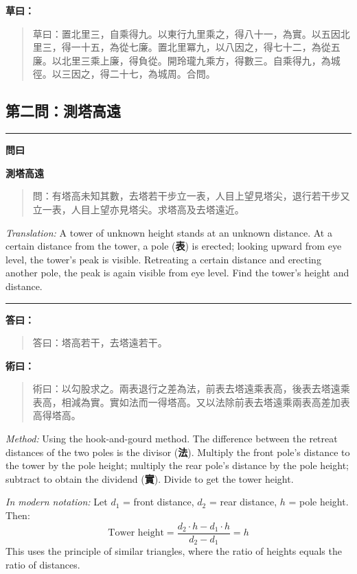 \documentclass[11pt,a4paper]{article}
\newenvironment{problem}[1][]{%
  \medskip\noindent\rule{\textwidth}{0.4pt}%
  \par\noindent\textbf{\color{sectioncolor}#1}\par\nopagebreak%
  \smallskip%
}{%
  \par\noindent\rule{\textwidth}{0.4pt}\medskip%
}
\newenvironment{answer}{%
  \medskip\noindent{\color{answercolor}\rule{0.5\textwidth}{0.5pt}}%
  \par\color{answercolor}%
}{%
  \par\medskip%
}
\newenvironment{method}{%
  \medskip\noindent{\color{methodcolor}\rule{0.5\textwidth}{0.5pt}}%
  \par\color{methodcolor}%
}{%
  \par\medskip%
}
\begin{document}
\noindent\textbf{草曰：}
\begin{quote}
\textcolor{chinacolor}{%
草曰：置北里三，自乘得九。以東行九里乘之，得八十一，為實。以五因北里三，得一十五，為從七廉。置北里冪九，以八因之，得七十二，為從五廉。以北里三乘上廉，得負從。開玲瓏九乘方，得數三。自乘得九，為城徑。以三因之，得二十七，為城周。合問。
}
\end{quote}

\subsection*{第二問：測塔高遠}

\begin{problem}[\textbf{問曰}]
\textbf{\color{sectioncolor}測塔高遠}

\begin{quote}
\textcolor{chinacolor}{%
問：有塔高未知其數，去塔若干步立一表，人目上望見塔尖，退行若干步又立一表，人目上望亦見塔尖。求塔高及去塔遠近。
}
\end{quote}

\textit{Translation:} A tower of unknown height stands at an unknown 
distance. At a certain distance from the tower, a pole (\textbf{表}) is erected; 
looking upward from eye level, the tower's peak is visible. Retreating 
a certain distance and erecting another pole, the peak is again visible 
from eye level. Find the tower's height and distance.
\end{problem}

\begin{answer}
\textbf{答曰：}

\begin{quote}
\textcolor{chinacolor}{%
答曰：塔高若干，去塔遠若干。
}
\end{quote}
\end{answer}

\begin{method}
\textbf{術曰：}

\begin{quote}
\textcolor{chinacolor}{%
術曰：以勾股求之。兩表退行之差為法，前表去塔遠乘表高，後表去塔遠乘表高，相減為實。實如法而一得塔高。又以法除前表去塔遠乘兩表高差加表高得塔高。
}
\end{quote}

\textit{Method:} Using the hook-and-gourd method. The difference between 
the retreat distances of the two poles is the divisor (\textbf{法}). Multiply the 
front pole's distance to the tower by the pole height; multiply the rear 
pole's distance by the pole height; subtract to obtain the dividend (\textbf{實}). 
Divide to get the tower height.

\medskip
\textit{In modern notation:} Let $d_1$ = front distance, $d_2$ = rear 
distance, $h$ = pole height. Then:
\[
\text{Tower height} = \frac{d_2 \cdot h - d_1 \cdot h}{d_2 - d_1} = h
\]
This uses the principle of similar triangles, where the ratio of heights 
equals the ratio of distances.
\end{method}
\end{document}
